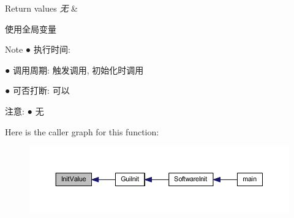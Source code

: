 \begin{DoxyRetVals}{\-Return values}
{\em 无} & \\
\hline
\end{DoxyRetVals}
\begin{DoxyParagraph}{使用全局变量 }

\end{DoxyParagraph}
\begin{DoxyNote}{\-Note}
● 执行时间\-: \par
 ● 调用周期\-: 触发调用, 初始化时调用 \par
 ● 可否打断\-: 可以 \par

\end{DoxyNote}
\begin{DoxyParagraph}{注意\-:}
● 无 \par
 
\end{DoxyParagraph}


\-Here is the caller graph for this function\-:\nopagebreak
\begin{figure}[H]
\begin{center}
\leavevmode
\includegraphics[width=350pt]{group___w_i_d_g_e_t_ga7a6ad9f67f512cb71394be195152a1bc_icgraph}
\end{center}
\end{figure}




